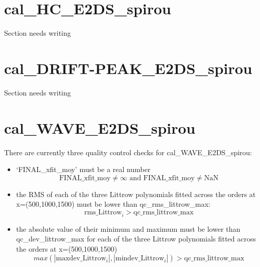 \section{cal\_HC\_E2DS\_spirou}
\label{section:qc_cal_HC_E2DS_spirou}


Section needs writing



\section{cal\_DRIFT-PEAK\_E2DS\_spirou}
\label{section:qc_cal_DRIFT-PEAK_E2DS}


Section needs writing


\section{cal\_WAVE\_E2DS\_spirou}
\label{section:qc_cal_WAVE_E2DS_spirou}

There are currently three quality control checks for cal\_WAVE\_E2DS\_spirou:

\begin{itemize}
\item `FINAL\_xfit\_moy' must be a real number
	\begin{equation}
	\text{FINAL\_xfit\_moy} \neq \infty \text{ and }
	\text{FINAL\_xfit\_moy} \neq \text{NaN}
	\end{equation}
\item the RMS of each of the three Littrow polynomials fitted across the orders at x=(500,1000,1500) must be lower than qc\_rms\_littrow\_max: 
	\begin{equation}
	\text{rms\_Littrow}_i > \text{qc\_rms\_littrow\_max}
	\end{equation}
\item the absolute value of their minimum and maximum must be lower than qc\_dev\_littrow\_max for each of the three Littrow polynomials fitted across the orders at x=(500,1000,1500)
	\begin{equation}
	max(|\text{maxdev\_Littrow}_i|, |\text{mindev\_Littrow}_i|) > \text{qc\_rms\_littrow\_max}
	\end{equation}
\end{itemize}

